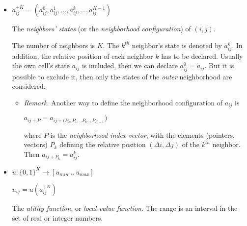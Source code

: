 \documentclass[10pt,a4paper]{article}  %
\begin{document}
\begin{itemize}
	\item  

	${a}^{+K}_{ij} = (a_{ij}^0, a_{ij}^1,\ldots, a_{ij}^k,\ldots, a_{ij}^{K-1})$   %

  
  The \textit{neighbors' states} (or the \textit{neighborhood configuration}) of $(i,j)$.

  
  The number of neighbors is $K$.
  The $k^{th}$ neighbor's state is denoted by $a_{ij}^k$.
  In addition, the relative position of each neighbor $k$ has to be declared.
  Usually the own cell's state $a_{ij}$ is included, then we can
  declare $a_{ij}^0 = a_{ij}$.
  But it is possible to exclude it, then only the states of the \textit{outer}
  neighborhood %
  are considered.   
       
       \begin{itemize}
         \item \textit{Remark}.
          Another way to define the neighborhood configuration of $a_{ij}$ is
          
          $a_{ij+P}=a_{ij+(P_0,P_1, .. P_k .. , P_{K-1}})$
          
          where $P$ is the \textit{neighborhood index vector}, with the elements (pointers, vectors)
          ${P_k}$ defining the relative position $(\Delta i, \Delta j)$ of the $k^{th}$ neighbor. 
          Then $a_{ij+P_k}=a_{ij}^k$.
       \end{itemize}
  
  
	\item
      $u: \{0,1\}^{K} \rightarrow [u_{min}~ .. ~u_{max}]$ %
      
      
      $u_{ij}= u(a^{+K}_{ij})$   
      
      The \textit{utility function}, or \textit{local value function}.	 
      The range is an interval in the set of real or integer numbers. 


\end{itemize}
\end{document}
